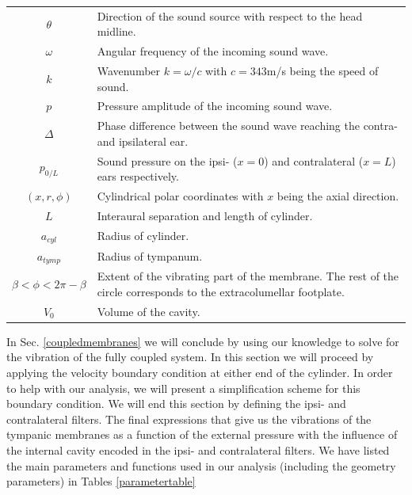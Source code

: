 \noindent
\begin{minipage}{\linewidth}
\renewcommand{\arraystretch}{1.1}
\centering
{} \label{parametertable} 
\begin{tabular}{c p{12 cm}}
\hline
$\theta$ & Direction of the sound source with respect to the head midline.\\
$\omega$ & Angular frequency of the incoming sound wave.\\
$k$ & Wavenumber $k=\omega/c$ with $c=343$m/s being the speed of sound.\\
$p$ & Pressure amplitude of the incoming sound wave.\\
$\Delta$ & Phase difference between the sound wave reaching the contra- and ipsilateral ear.\\
$p_{0/L}$ & Sound pressure on the ipsi- ($x=0$) and contralateral ($x=L$) ears respectively.\\
$(x,r,\phi)$ & Cylindrical polar coordinates with $x$ being the axial direction.\\
$L$ & Interaural separation and length of cylinder.\\
$a_{cyl}$ & Radius of cylinder.\\
$a_{tymp}$ & Radius of tympanum.\\
$\beta<\phi<2\pi-\beta$ & Extent of the vibrating part of the membrane. The rest of the circle corresponds to
the extracolumellar footplate.\\
$V_0$ & Volume of the cavity.\\
\hline
\end {tabular}\par
\bigskip
\end{minipage}
In Sec. \ref{coupledmembranes} we will conclude by using our knowledge to solve for the vibration of the fully coupled
system. In this section we will  proceed by applying the velocity boundary condition at either end of the cylinder. In
order to help with our analysis, we will present a simplification scheme for this boundary condition. We will end this section
by defining the ipsi- and contralateral filters. The final expressions that give us the vibrations 
of the tympanic membranes as a function of the external pressure with the influence of the internal cavity encoded in the ipsi- and contralateral filters. 
We have listed the main parameters and functions used in our analysis (including the geometry parameters) in Tables \ref{parametertable}
